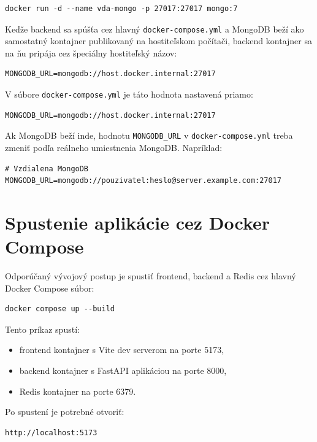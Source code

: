 \documentclass[a4paper, 12pt]{article}
\begin{document}
\begin{lstlisting}
docker run -d --name vda-mongo -p 27017:27017 mongo:7
\end{lstlisting}

Keďže backend sa spúšťa cez hlavný \texttt{docker-compose.yml} a MongoDB beží ako samostatný kontajner publikovaný na hostiteľskom počítači, backend kontajner sa na ňu pripája cez špeciálny hostiteľský názov:

\begin{lstlisting}
MONGODB_URL=mongodb://host.docker.internal:27017
\end{lstlisting}

V súbore \texttt{docker-compose.yml} je táto hodnota nastavená priamo:

\begin{lstlisting}
MONGODB_URL=mongodb://host.docker.internal:27017
\end{lstlisting}

Ak MongoDB beží inde, hodnotu \texttt{MONGODB\_URL} v \texttt{docker-compose.yml} treba zmeniť podľa reálneho umiestnenia MongoDB. Napríklad:

\begin{lstlisting}
# Vzdialena MongoDB
MONGODB_URL=mongodb://pouzivatel:heslo@server.example.com:27017
\end{lstlisting}

\section{Spustenie aplikácie cez Docker Compose}

Odporúčaný vývojový postup je spustiť frontend, backend a Redis cez hlavný Docker Compose súbor:

\begin{lstlisting}
docker compose up --build
\end{lstlisting}

Tento príkaz spustí:

\begin{itemize}
    \item frontend kontajner s Vite dev serverom na porte 5173,
    \item backend kontajner s FastAPI aplikáciou na porte 8000,
    \item Redis kontajner na porte 6379.
\end{itemize}

Po spustení je potrebné otvoriť:

\begin{lstlisting}
http://localhost:5173
\end{lstlisting}
\end{document}
